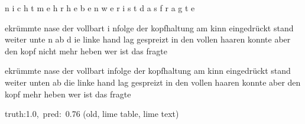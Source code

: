 \documentclass[a4paper,10pt,twoside]{article}
\begin{document}
{\color[rgb]{1,0,0} n}{\color[rgb]{1,0,0} i}{\color[rgb]{1,0,0} c}{\color[rgb]{1,0,0} h}{\color[rgb]{0.0,0,0} t} {\color[rgb]{0.031,0,0} m}{\color[rgb]{0.187,0,0} e}{\color[rgb]{0.024,0,0} h}{\color[rgb]{0.139,0,0} r} {\color[rgb]{0.1,0,0} h}{\color[rgb]{0.558,0,0} e}{\color[rgb]{0.85,0,0} b}{\color[rgb]{1,0,0} e}{\color[rgb]{0.14,0,0} n} {\color[rgb]{1,0,0} w}{\color[rgb]{1,0,0} e}{\color[rgb]{1,0,0} r} {\color[rgb]{0.693,0,0} i}{\color[rgb]{1,0,0} s}{\color[rgb]{1,0,0} t} {\color[rgb]{1,0,0} d}{\color[rgb]{1,0,0} a}{\color[rgb]{1,0,0} s} {\color[rgb]{1,0,0} f}{\color[rgb]{1,0,0} r}{\color[rgb]{1,0,0} a}{\color[rgb]{1,0,0} g}{\color[rgb]{1,0,0} t}{\color[rgb]{0.0,0,0} e} 

ekrümmte nase der vollbart i{\color[rgb]{1,0,0} n}folge der kopfhaltung am kinn eingedrückt stand weiter unte{\color[rgb]{1,0,0} n} ab d{\color[rgb]{1,0,0} i}e linke hand lag gespreizt in den vollen haaren konnte aber den kopf nicht mehr heben wer {\color[rgb]{1,0,0} i}st das {\color[rgb]{1,0,0} f}ragte 

 {\color[rgb]{0,0,1} ekrümmte} nase der {\color[rgb]{0,0,1} vollbart} infolge der kopfhaltung am kinn eingedrückt {\color[rgb]{0,0,1} stand} weiter unten ab die linke hand lag gespreizt in den vollen haaren konnte aber den {\color[rgb]{1,0,0} kopf}  mehr heben wer ist das fragte 

 {\footnotesize {\color[rgb]{0.6, 0.6, 0.6}truth:1.0,~pred:~0.76}} (old, lime table, lime text)\hrulefill
\end{document}
